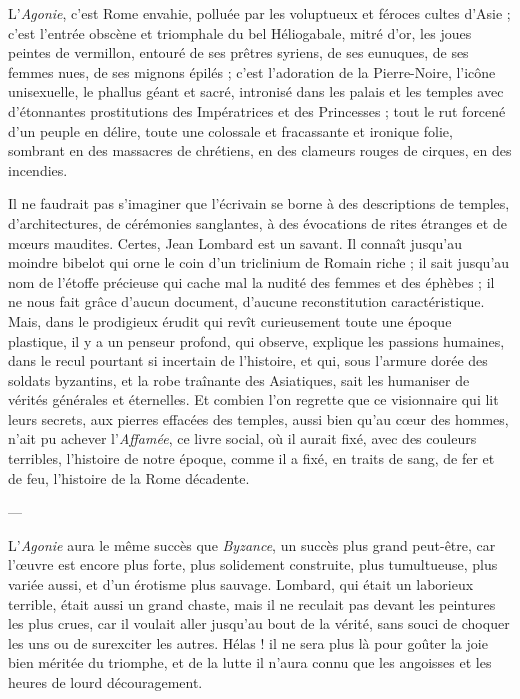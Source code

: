 \documentclass[a4paper, 11pt, oneside, polutonikogreek, french]{article}
\begin{document}
L'\emph{Agonie}, c'est Rome envahie, polluée par les voluptueux et féroces cultes d'Asie ; c'est l'entrée obscène et triomphale du bel Héliogabale, mitré d'or, les joues peintes de vermillon, entouré de ses prêtres syriens, de ses eunuques, de ses femmes nues, de ses mignons épilés ; c'est l'adoration de la Pierre-Noire, l'icône unisexuelle, le phallus géant et sacré, intronisé dans les palais et les temples avec d'étonnantes prostitutions des Impératrices et des Princesses ; tout le rut forcené d'un peuple en délire, toute une colossale et fracassante et ironique folie, sombrant en des massacres de chrétiens, en des clameurs rouges de cirques, en des incendies.

Il ne faudrait pas s'imaginer que l'écrivain se borne à des descriptions de temples, d'architectures, de cérémonies sanglantes, à des évocations de rites étranges et de mœurs maudites. Certes, Jean Lombard est un savant. Il connaît jusqu'au moindre bibelot qui orne le coin d'un triclinium de Romain riche ; il sait jusqu'au nom de l'étoffe précieuse qui cache mal la nudité des femmes et des éphèbes ; il ne nous fait grâce d'aucun document, d'aucune reconstitution caractéristique. Mais, dans le prodigieux érudit qui revît curieusement toute une époque plastique, il y a un penseur profond, qui observe, explique les passions humaines, dans le recul pourtant si incertain de l'histoire, et qui, sous l'armure dorée des soldats byzantins, et la robe traînante des Asiatiques, sait les humaniser de vérités générales et éternelles. Et combien l'on regrette que ce visionnaire qui lit leurs secrets, aux pierres effacées des temples, aussi bien qu'au cœur des hommes, n'ait pu achever l'\emph{Affamée}, ce livre social, où il aurait fixé, avec des couleurs terribles, l'histoire de notre époque, comme il a fixé, en traits de sang, de fer et de feu, l'histoire de la Rome décadente.

---

L'\emph{Agonie} aura le même succès que \emph{Byzance}, un succès plus grand peut-être, car l'œuvre est encore plus forte, plus solidement construite, plus tumultueuse, plus variée aussi, et d'un érotisme plus sauvage. Lombard, qui était un laborieux terrible, était aussi un grand chaste, mais il ne reculait pas devant les peintures les plus crues, car il voulait aller jusqu'au bout de la vérité, sans souci de choquer les uns ou de surexciter les autres. Hélas ! il ne sera plus là pour goûter la joie bien méritée du triomphe, et de la lutte il n'aura connu que les angoisses et les heures de lourd découragement.
\end{document}
